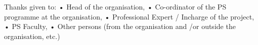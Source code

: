 
Thanks given to:
• Head of the organisation,
• Co-ordinator of the PS programme at the organisation,
• Professional Expert / Incharge of the project,
• PS Faculty,
• Other persons (from the organisation and /or outside the organisation, etc.)
